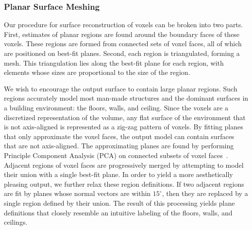 \documentclass[journal]{IEEEtran}
\begin{document}
\subsubsection{Planar Surface Meshing}
\label{sssec:planar_meshing}

Our procedure for surface reconstruction of voxels can be broken into two parts.  First, estimates of planar regions are found around the boundary faces of these voxels.  These regions are formed from connected sets of voxel faces, all of which are positioned on best-fit planes.  Second, each region is triangulated, forming a mesh.  This triangulation lies along the best-fit plane for each region, with elements whose sizes are proportional to the size of the region.

We wish to encourage the output surface to contain large planar regions.  Such regions accurately model most man-made structures and the dominant surfaces in a building environment: the floors, walls, and ceiling.  Since the voxels are a discretized representation of the volume, any flat surface of the environment that is not axis-aligned is represented as a zig-zag pattern of voxels.  By fitting planes that only approximate the voxel faces, the output model can contain surfaces that are not axis-aligned.  The approximating planes are found by performing Principle Component Analysis (PCA) on connected subsets of voxel faces~\cite{PCA}.  Adjacent regions of voxel faces are progressively merged by attempting to model their union with a single best-fit plane.  In order to yield a more aesthetically pleasing output, we further relax these region definitions.  If two adjacent regions are fit by planes whose normal vectors are within $15^{\circ}$, then they are replaced by a single region defined by their union.  The result of this processing yields plane definitions that closely resemble an intuitive labeling of the floors, walls, and ceilings. 
\end{document}
